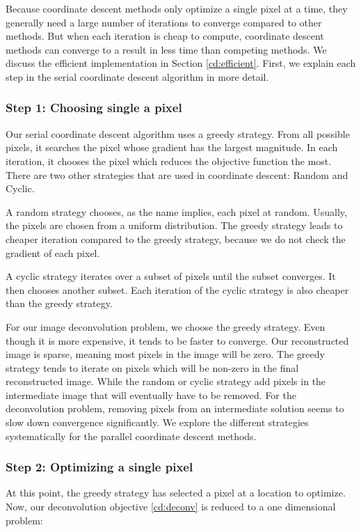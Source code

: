 Because coordinate descent methods only optimize a single pixel at a time, they generally need a large number of iterations to converge compared to other methods. But when each iteration is cheap to compute, coordinate descent methods can converge to a result in less time than competing methods\cite{nesterov2012efficiency, nesterov2013gradient}. We discuss the efficient implementation in Section \ref{cd:efficient}. First, we explain each step in the serial coordinate descent algorithm in more detail.

\subsubsection{Step 1: Choosing single a pixel}
Our serial coordinate descent algorithm uses a greedy strategy. From all possible pixels, it searches the pixel whose gradient has the largest magnitude. In each iteration, it chooses the pixel which reduces the objective function the most. There are two other strategies that are used in coordinate descent: Random and Cyclic.

A random strategy chooses, as the name implies, each pixel at random. Usually, the pixels are chosen from a uniform distribution. The greedy strategy leads to cheaper iteration compared to the greedy strategy, because we do not check the gradient of each pixel.

A cyclic strategy iterates over a subset of pixels until the subset converges. It then chooses another subset. Each iteration of the cyclic strategy is also cheaper than the greedy strategy. 

For our image deconvolution problem, we choose the greedy strategy. Even though it is more expensive, it tends to be faster to converge. Our reconstructed image is sparse, meaning most pixels in the image will be zero. The greedy strategy tends to iterate on pixels which will be non-zero in the final reconstructed image. While the random or cyclic strategy add pixels in the intermediate image that will eventually have to be removed. For the deconvolution problem, removing pixels from an intermediate solution seems to slow down convergence significantly. We explore the different strategies systematically for the parallel coordinate descent methods.


\subsubsection{Step 2: Optimizing a single pixel}
At this point, the greedy strategy has selected a pixel at a location to optimize. Now, our deconvolution objective \eqref{cd:deconv} is reduced to a one dimensional problem:  

